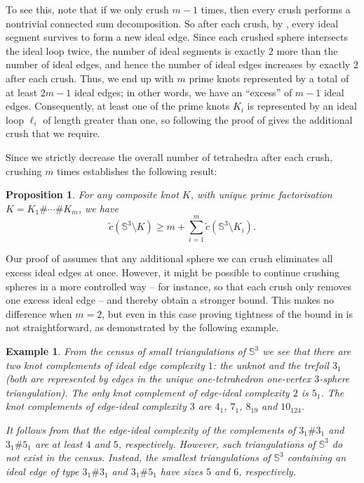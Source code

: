 \documentclass[10pt,a4paper]{amsart}
\newtheorem{proposition}[theorem]{Proposition}
\newtheorem{example}[theorem]{Example}
\begin{document}
To see this, note that if we only crush $m-1$ times, then every crush performs a nontrivial connected sum decomposition.
So after each crush, by , every ideal segment survives to form a new ideal edge.
Since each crushed sphere intersects the ideal loop twice, the number of ideal segments is exactly $2$ more than the number of ideal edges, and hence the number of ideal edges increases by exactly $2$ after each crush.
Thus, we end up with $m$ prime knots represented by a total of at least $2m-1$ ideal edges;
in other words, we have an ``excess'' of $m-1$ ideal edges.
Consequently, at least one of the prime knots $K_i$ is represented by an ideal loop $\ell_i$ of length greater than one,
so following the proof of  gives the additional crush that we require.

Since we strictly decrease the overall number of tetrahedra after each crush, crushing $m$ times establishes the following result:

\begin{proposition}\label{prop:edgeIdealBound}
For any composite knot $K$, with unique prime factorisation $K = K_1 \# \cdots \# K_m$, we have
\[
\tilde{c}(\mathbb{S}^3 \setminus K) \geqslant m + \sum_{i=1}^{m} \tilde{c}(\mathbb{S}^3 \setminus K_i).
\]
\end{proposition}

Our proof of  assumes that any additional sphere we can crush eliminates all excess ideal edges at once.
However, it might be possible to continue crushing spheres in a more controlled way -- for instance, so that each crush only removes one excess ideal edge -- and thereby obtain a stronger bound.
This makes no difference when $m=2$, but even in this case proving tightness of the bound in  is not straightforward, as demonstrated by the following example.

\begin{example}
  \label{appex:bounds}
  From the census of small triangulations of $\mathbb{S}^3$ we see that there are two knot complements of ideal edge complexity $1$: the unknot and the trefoil $3_1$ (both are represented by edges in the unique one-tetrahedron one-vertex $3$-sphere triangulation).
The only knot complement of edge-ideal complexity $2$ is $5_1$.
The knot complements of edge-ideal complexity $3$ are $4_1$, $7_1$, $8_{19}$ and $10_{124}$.

  It follows from  that the edge-ideal complexity of the complements of $3_1 \# 3_1$ and $3_1 \# 5_1$ are at least $4$ and $5$, respectively.
  However, such triangulations of $\mathbb{S}^3$ do not exist in the census.
Instead, the smallest triangulations of $\mathbb{S}^3$ containing an ideal edge of type $3_1 \# 3_1$ and $3_1 \# 5_1$ have sizes $5$ and $6$, respectively.
\end{example}
\end{document}
